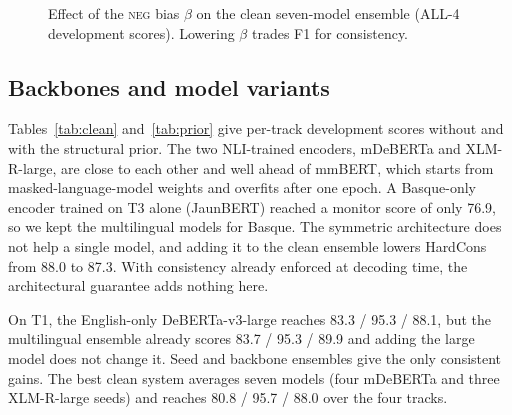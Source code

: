 \documentclass[conference]{IEEEtran}
\newcommand{\NEG}{\textsc{neg}}
\begin{document}
\begin{figure}[!t]
\centering
{}
\caption{Effect of the \NEG{} bias $\beta$ on the clean seven-model ensemble
(ALL-4 development scores). Lowering $\beta$ trades F1 for consistency.}
\label{fig:bias}
\end{figure}

\subsection{Backbones and model variants}
Tables~\ref{tab:clean} and~\ref{tab:prior} give per-track development scores
without and with the structural prior. The two NLI-trained encoders,
mDeBERTa and XLM-R-large, are close to each other and well ahead of mmBERT,
which starts from masked-language-model weights and overfits after one epoch.
A Basque-only encoder trained on T3 alone (JaunBERT) reached a monitor score
of only 76.9, so we kept the multilingual models for Basque. The symmetric
architecture does not help a single model, and adding it to the clean
ensemble lowers HardCons from 88.0 to 87.3. With consistency already enforced
at decoding time, the architectural guarantee adds nothing here.

On T1, the English-only DeBERTa-v3-large reaches 83.3 / 95.3 / 88.1, but the
multilingual ensemble already scores 83.7 / 95.3 / 89.9 and adding the large
model does not change it. Seed and backbone ensembles give the only
consistent gains. The best clean system averages seven models (four mDeBERTa
and three XLM-R-large seeds) and reaches 80.8 / 95.7 / 88.0 over the four
tracks.
\end{document}
